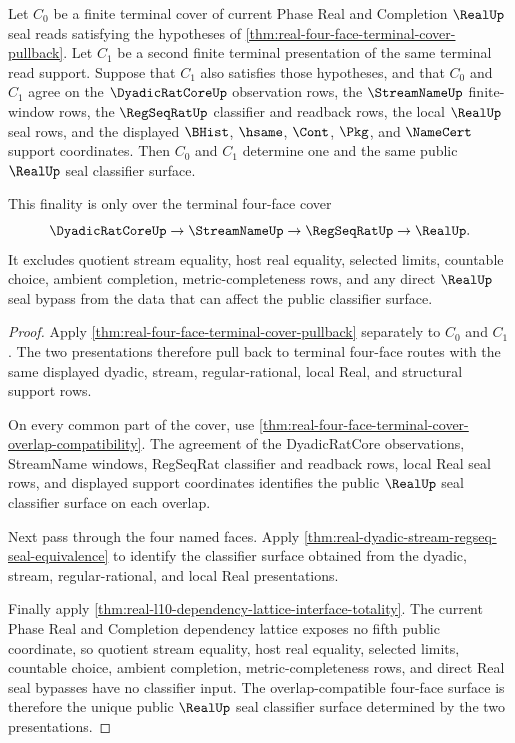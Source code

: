 \begin{theorem}
\label{thm:real-four-face-terminal-cover-classifier-finality}
Let $C_0$ be a finite terminal cover of current Phase Real and Completion
$\RealUp$ seal reads satisfying the hypotheses of
\autoref{thm:real-four-face-terminal-cover-pullback}. Let $C_1$ be a second
finite terminal presentation of the same terminal read support. Suppose that
$C_1$ also satisfies those hypotheses, and that $C_0$ and $C_1$ agree on the
$\DyadicRatCoreUp$ observation rows, the $\StreamNameUp$ finite-window rows,
the $\RegSeqRatUp$ classifier and readback rows, the local $\RealUp$ seal
rows, and the displayed $\BHist$, $\hsame$, $\Cont$, $\Pkg$, and $\NameCert$
support coordinates. Then $C_0$ and $C_1$ determine one and the same public
$\RealUp$ seal classifier surface.

This finality is only over the terminal four-face cover
$$
\DyadicRatCoreUp \to \StreamNameUp \to \RegSeqRatUp \to \RealUp.
$$
It excludes quotient stream equality, host real equality, selected limits,
countable choice, ambient completion, metric-completeness rows, and any
direct $\RealUp$ seal bypass from the data that can affect the public
classifier surface.
\end{theorem}
\begin{proof}
Apply \autoref{thm:real-four-face-terminal-cover-pullback} separately to
$C_0$ and $C_1$. The two presentations therefore pull back to terminal
four-face routes with the same displayed dyadic, stream, regular-rational,
local Real, and structural support rows.

On every common part of the cover, use
\autoref{thm:real-four-face-terminal-cover-overlap-compatibility}. The
agreement of the DyadicRatCore observations, StreamName windows, RegSeqRat
classifier and readback rows, local Real seal rows, and displayed support
coordinates identifies the public $\RealUp$ seal classifier surface on each
overlap.

Next pass through the four named faces. Apply
\autoref{thm:real-dyadic-stream-regseq-seal-equivalence} to identify the
classifier surface obtained from the dyadic, stream, regular-rational, and
local Real presentations.

Finally apply
\autoref{thm:real-l10-dependency-lattice-interface-totality}. The current
Phase Real and Completion dependency lattice exposes no fifth public
coordinate, so quotient stream equality, host real equality, selected limits,
countable choice, ambient completion, metric-completeness rows, and direct
Real seal bypasses have no classifier input. The overlap-compatible
four-face surface is therefore the unique public $\RealUp$ seal classifier
surface determined by the two presentations.
\end{proof}

